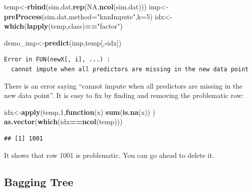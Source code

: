 \documentclass[12pt,]{krantz}
\newenvironment{Shaded}{\begin{snugshade}}{\end{snugshade}}
\newcommand{\KeywordTok}[1]{\textcolor[rgb]{0.13,0.29,0.53}{\textbf{#1}}}
\newcommand{\DataTypeTok}[1]{\textcolor[rgb]{0.13,0.29,0.53}{#1}}
\newcommand{\DecValTok}[1]{\textcolor[rgb]{0.00,0.00,0.81}{#1}}
\newcommand{\StringTok}[1]{\textcolor[rgb]{0.31,0.60,0.02}{#1}}
\newcommand{\OtherTok}[1]{\textcolor[rgb]{0.56,0.35,0.01}{#1}}
\newcommand{\ControlFlowTok}[1]{\textcolor[rgb]{0.13,0.29,0.53}{\textbf{#1}}}
\newcommand{\OperatorTok}[1]{\textcolor[rgb]{0.81,0.36,0.00}{\textbf{#1}}}
\newcommand{\NormalTok}[1]{#1}
\theoremstyle{definition}
\theoremstyle{definition}
\theoremstyle{definition}
\theoremstyle{remark}
\begin{document}
\begin{Shaded}
\begin{Highlighting}[]
\NormalTok{temp<-}\KeywordTok{rbind}\NormalTok{(sim.dat,}\KeywordTok{rep}\NormalTok{(}\OtherTok{NA}\NormalTok{,}\KeywordTok{ncol}\NormalTok{(sim.dat)))}
\NormalTok{imp<-}\KeywordTok{preProcess}\NormalTok{(sim.dat,}\DataTypeTok{method=}\StringTok{"knnImpute"}\NormalTok{,}\DataTypeTok{k=}\DecValTok{5}\NormalTok{)}
\NormalTok{idx<-}\KeywordTok{which}\NormalTok{(}\KeywordTok{lapply}\NormalTok{(temp,class)}\OperatorTok{==}\StringTok{"factor"}\NormalTok{)}
\end{Highlighting}
\end{Shaded}

\begin{Shaded}
\begin{Highlighting}[]
\NormalTok{demo_imp<-}\KeywordTok{predict}\NormalTok{(imp,temp[,}\OperatorTok{-}\NormalTok{idx])}
\end{Highlighting}
\end{Shaded}

\begin{verbatim}
Error in FUN(newX[, i], ...) : 
  cannot impute when all predictors are missing in the new data point
\end{verbatim}

There is an error saying ``cannot impute when all predictors are missing
in the new data point''. It is easy to fix by finding and removing the
problematic row:

\begin{Shaded}
\begin{Highlighting}[]
\NormalTok{idx<-}\KeywordTok{apply}\NormalTok{(temp,}\DecValTok{1}\NormalTok{,}\ControlFlowTok{function}\NormalTok{(x) }\KeywordTok{sum}\NormalTok{(}\KeywordTok{is.na}\NormalTok{(x)) )}
\KeywordTok{as.vector}\NormalTok{(}\KeywordTok{which}\NormalTok{(idx}\OperatorTok{==}\KeywordTok{ncol}\NormalTok{(temp)))}
\end{Highlighting}
\end{Shaded}

\begin{verbatim}
## [1] 1001
\end{verbatim}

It shows that row 1001 is problematic. You can go ahead to delete it.

\subsection{Bagging Tree}\label{bagging-tree}
\end{document}
